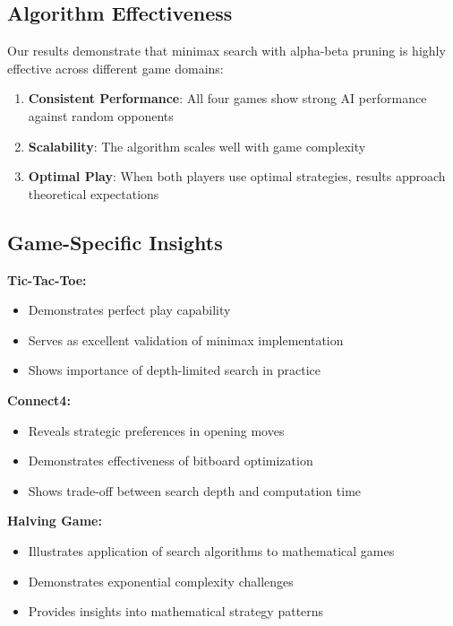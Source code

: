\documentclass[12pt]{article}
\begin{document}
\subsection{Algorithm Effectiveness}

Our results demonstrate that minimax search with alpha-beta pruning is highly effective across different game domains:

\begin{enumerate}
    \item \textbf{Consistent Performance}: All four games show strong AI performance against random opponents
    \item \textbf{Scalability}: The algorithm scales well with game complexity
    \item \textbf{Optimal Play}: When both players use optimal strategies, results approach theoretical expectations
\end{enumerate}

\subsection{Game-Specific Insights}

\textbf{Tic-Tac-Toe:}
\begin{itemize}
    \item Demonstrates perfect play capability
    \item Serves as excellent validation of minimax implementation
    \item Shows importance of depth-limited search in practice
\end{itemize}

\textbf{Connect4:}
\begin{itemize}
    \item Reveals strategic preferences in opening moves
    \item Demonstrates effectiveness of bitboard optimization
    \item Shows trade-off between search depth and computation time
\end{itemize}

\textbf{Halving Game:}
\begin{itemize}
    \item Illustrates application of search algorithms to mathematical games
    \item Demonstrates exponential complexity challenges
    \item Provides insights into mathematical strategy patterns
\end{itemize}
\end{document}
